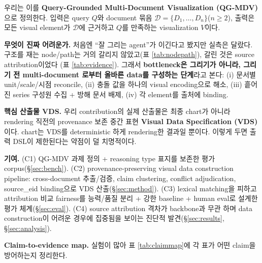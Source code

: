 \documentclass[11pt]{article}
\begin{document}
우리는 이를 \textbf{Query-Grounded Multi-Document Visualization (QG-MDV)}으로 정의한다. 입력은
query $Q$와 document 묶음 $\mathcal{D}=\{D_1,\dots,D_n\}$($n\geq2$), 출력은 모든 visual element가
$\mathcal{D}$에 근거하고 $Q$를 만족하는 visualization $V$이다.

\textbf{무엇이 진짜 어려운가.} 처음엔 ``잘 그리는 agent''가 이긴다고 봤지만 실측은 달랐다. 구조를
재는 node/path는 거의 갈리지 않았고(표 \ref{tab:nodepath}), 갈린 것은 source attribution이었다
(표 \ref{tab:evidence}). 그래서 \textbf{bottleneck은 그리기가 아니라, 그리기 전 multi-document
로부터 올바른 data를 구성하는 단계}라고 본다: (i) 문서별 unit/scale/시점 reconcile, (ii) 충돌
값을 하나의 visual encoding으로 해소, (iii) 흩어진 series 구성원 수집 + 방해 문서 배제, (iv) 각
element를 출처에 binding.

\textbf{핵심 산출물 VDS.} 우리 contribution의 실제 산출물은 최종 chart가 아니라 rendering 직전의
provenance 보존 중간 표현 \textbf{Visual Data Specification (VDS)}이다. chart는 VDS를 deterministic
하게 rendering한 결과일 뿐이다. 이렇게 두면 출력 DSL이 제한된다는 약점이 덜 치명적이다.

\textbf{기여.} (C1) QG-MDV 과제 정의 + reasoning type 표지를 보존한 평가 corpus(\S\ref{sec:bench}).
(C2) provenance-preserving visual data construction pipeline: cross-document 추출/검증, claim
clustering, conflict adjudication, source\_eid binding으로 VDS 산출(\S\ref{sec:method}). (C3)
lexical matching을 피하고 attribution 비교 fairness를 능력/품질 분리 + 강한 baseline +
human eval로 설계한 평가 체계(\S\ref{sec:eval}). (C4) source attribution 격차가 backbone과 무관
하며 data construction이 어려운 경우에 집중됨을 보이는 진단적 발견(\S\ref{sec:results},
\S\ref{sec:analysis}).

\textbf{Claim-to-evidence map.} 실험이 많아 표 \ref{tab:claimmap}에 각 표가 어떤 claim을
방어하는지 정리한다.
\end{document}
